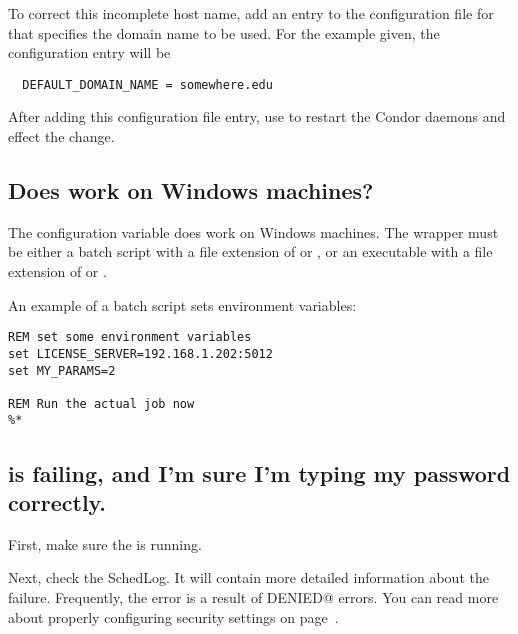 To correct this incomplete host name, add an entry to the
configuration file for
that specifies the domain name to be used.
For the example given, the configuration entry will be
\begin{verbatim}
  DEFAULT_DOMAIN_NAME = somewhere.edu
\end{verbatim}

After adding this configuration file entry, use 
to restart the Condor daemons and effect the change.

%

\subsection*{Does  work on Windows machines?}
The  configuration variable
does work on Windows machines.
The wrapper must be either a
batch script with a file extension of  or ,
or an
executable with a file extension of  or .

An example of a batch script sets environment variables:
\footnotesize
\begin{verbatim}
REM set some environment variables
set LICENSE_SERVER=192.168.1.202:5012
set MY_PARAMS=2

REM Run the actual job now
%*
\end{verbatim}
\normalsize


\subsection*{ is failing, and I'm sure I'm typing my password correctly.}

First, make sure the  is running.

Next, check the SchedLog. It will contain more detailed information
about the failure. Frequently, the error is a result of 
\verb@PERMISSION DENIED@ errors. You can read more about properly configuring 
security settings on page~\pageref{sec:Host-Security}.


